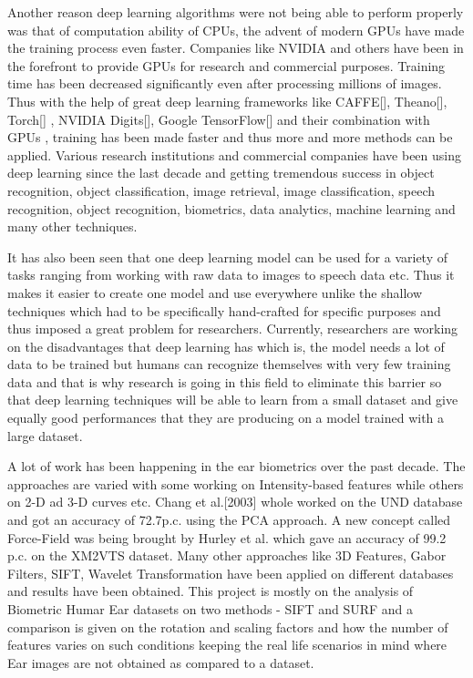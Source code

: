 Another reason deep learning algorithms were not being able to perform properly was that of computation ability of CPUs, the advent of modern GPUs have made the training process even faster. Companies like NVIDIA and others have been in the forefront to provide GPUs for research and commercial purposes. Training time has been decreased significantly even after processing millions of images. Thus with the help of great deep learning frameworks like CAFFE[], Theano[], Torch[] , NVIDIA Digits[], Google TensorFlow[] and their combination with GPUs , training has been made faster and thus more and more methods can be applied. Various research institutions and commercial companies have been using deep learning since the last decade and getting tremendous success in object recognition, object classification, image retrieval, image classification, speech recognition, object recognition, biometrics, data analytics, machine learning and many other techniques.

It has also been seen that one deep learning model can be used for a variety of tasks ranging from working with raw data to images to speech data etc. Thus it makes it easier to create one model and use everywhere unlike the shallow techniques which had to be specifically hand-crafted for specific purposes and thus imposed a great problem for researchers. Currently, researchers are working on the disadvantages that deep learning has which is, the model needs a lot of data to be trained but humans can recognize themselves with very few training data and that is why research is going in this field to eliminate this barrier so that deep learning techniques will be able to learn from a small dataset and give equally good performances that they are producing on a model trained with a large dataset.

A lot of work has been happening in the ear biometrics over the past decade. The approaches are varied with some working on Intensity-based features while others on 2-D ad 3-D curves etc. Chang et al.[2003] whole worked on the UND database and got an accuracy of 72.7p.c. using the PCA approach. A new concept called Force-Field was being brought by Hurley et al. which gave an accuracy of 99.2 p.c. on the XM2VTS dataset. Many other approaches like 3D Features, Gabor Filters, SIFT, Wavelet Transformation have been applied on different databases and results have been obtained. This project is mostly on the analysis of Biometric Humar Ear datasets on two methods - SIFT and SURF and a comparison is given on the rotation and scaling factors and how the number of features varies on such conditions keeping the real life scenarios in mind where Ear images are not obtained as compared to a dataset.


